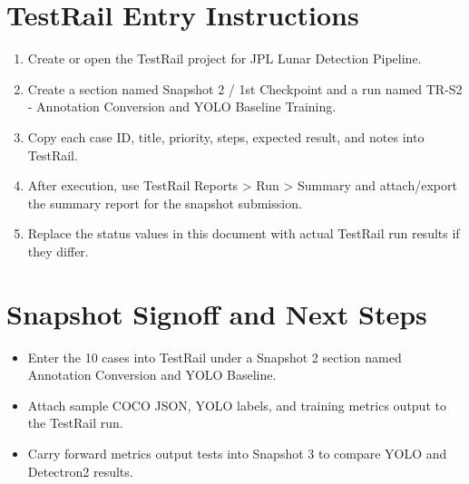 \documentclass[11pt,landscape]{article}
\begin{document}
\section*{TestRail Entry Instructions}
\begin{enumerate}[leftmargin=*]
\item Create or open the TestRail project for JPL Lunar Detection Pipeline.
\item Create a section named Snapshot 2 / 1st Checkpoint and a run named TR-S2 - Annotation Conversion and YOLO Baseline Training.
\item Copy each case ID, title, priority, steps, expected result, and notes into TestRail.
\item After execution, use TestRail Reports > Run > Summary and attach/export the summary report for the snapshot submission.
\item Replace the status values in this document with actual TestRail run results if they differ.
\end{enumerate}
\section*{Snapshot Signoff and Next Steps}
\begin{itemize}[leftmargin=*]
\item Enter the 10 cases into TestRail under a Snapshot 2 section named Annotation Conversion and YOLO Baseline.
\item Attach sample COCO JSON, YOLO labels, and training metrics output to the TestRail run.
\item Carry forward metrics output tests into Snapshot 3 to compare YOLO and Detectron2 results.
\end{itemize}
\end{document}
